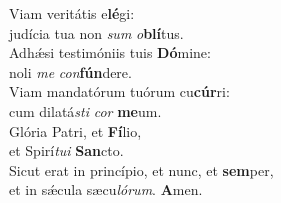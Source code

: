 \evenverse Viam veritátis e\textbf{lé}gi:~\*\\
\evenverse judícia tua non \textit{sum} \textit{o}\textbf{blí}tus.\\
\oddverse Adhǽsi testimóniis tuis \textbf{Dó}mine:~\*\\
\oddverse noli \textit{me} \textit{con}\textbf{fún}dere.\\
\evenverse Viam mandatórum tuórum cu\textbf{cúr}ri:~\*\\
\evenverse cum dilatá\textit{sti} \textit{cor} \textbf{me}um.\\
\oddverse Glória Patri, et \textbf{Fí}lio,~\*\\
\oddverse et Spirí\textit{tu}\textit{i} \textbf{San}cto.\\
\evenverse Sicut erat in princípio, et nunc, et \textbf{sem}per,~\*\\
\evenverse et in sǽcula sæcu\textit{ló}\textit{rum}. \textbf{A}men.\\

